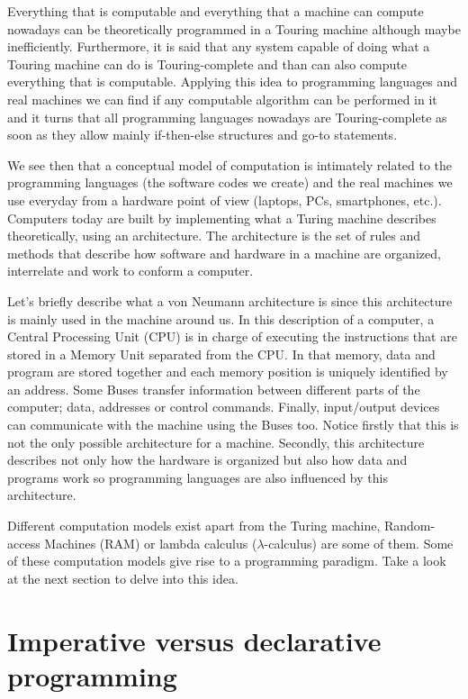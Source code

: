 Everything that is computable and everything that a machine can compute nowadays can be theoretically programmed in a Touring machine 
although maybe inefficiently. Furthermore, it is said that any system capable of doing what a Touring machine can do is Touring-complete and 
than can also compute everything that is computable. Applying this idea to programming languages and real machines we can find if any 
computable algorithm can be performed in it and it turns that all programming languages nowadays are Touring-complete as soon as they allow 
mainly if-then-else structures and go-to statements. 

We see then that a conceptual model of computation is intimately related to the programming languages (the software codes we create) and the 
real machines we use everyday from a hardware point of view (laptops, PCs, smartphones, etc.). Computers today are built by implementing what 
a Turing machine describes theoretically, using an architecture. The architecture is the set of rules and methods that describe how software 
and hardware in a machine are organized, interrelate and work to conform a computer.

Let's briefly describe what a von Neumann architecture is since this architecture is mainly used in the machine around us. 
In this description of a computer, a Central Processing Unit (CPU) is in charge of executing the instructions that are stored in a Memory Unit separated from the CPU. 
In that memory, data and program are stored together and each memory position is uniquely identified by an address. 
Some Buses transfer information between different parts of the computer; data, addresses or control commands. 
Finally, input/output devices can communicate with the machine using the Buses too. 
Notice firstly that this is not the only possible architecture for a machine. 
Secondly, this architecture describes not only how the hardware is organized but also how data and programs work so programming languages are also influenced by this architecture. 


Different computation models exist apart from the Turing machine, Random-access Machines (RAM) or lambda calculus ($\lambda$-calculus) are some of them. 
Some of these computation models give rise to a programming paradigm. Take a look at the next section to delve into this idea.  


 
 
    \section{Imperative versus declarative programming} 

